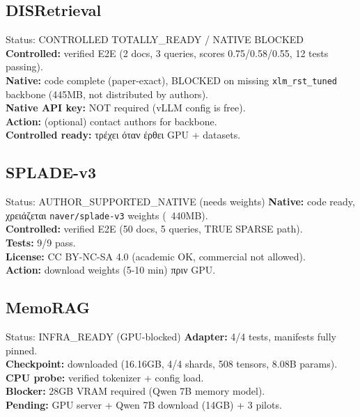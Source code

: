 \documentclass[11pt,a4paper]{article}
\begin{document}
\subsection{DISRetrieval}

\begin{statusbox}{Status: CONTROLLED TOTALLY\_READY / NATIVE BLOCKED}
\textbf{Controlled:} verified E2E (2 docs, 3 queries, scores 0.75/0.58/0.55, 12 tests passing). \\
\textbf{Native:} code complete (paper-exact), BLOCKED on missing \texttt{xlm\_rst\_tuned} backbone (445MB, not distributed by authors). \\
\textbf{Native API key:} NOT required (vLLM config is free). \\
\textbf{Action:} (optional) contact authors for backbone. \\
\textbf{Controlled ready:} τρέχει όταν έρθει GPU + datasets.
\end{statusbox}

\subsection{SPLADE-v3}

\begin{statusbox}{Status: AUTHOR\_SUPPORTED\_NATIVE (needs weights)}
\textbf{Native:} code ready, χρειάζεται \texttt{naver/splade-v3} weights (~440MB). \\
\textbf{Controlled:} verified E2E (50 docs, 5 queries, TRUE SPARSE path). \\
\textbf{Tests:} 9/9 pass. \\
\textbf{License:} CC BY-NC-SA 4.0 (academic OK, commercial not allowed). \\
\textbf{Action:} download weights (5-10 min) πριν GPU.
\end{statusbox}

\subsection{MemoRAG}

\begin{statusbox}{Status: INFRA\_READY (GPU-blocked)}
\textbf{Adapter:} 4/4 tests, manifests fully pinned. \\
\textbf{Checkpoint:} downloaded (16.16GB, 4/4 shards, 508 tensors, 8.08B params). \\
\textbf{CPU probe:} verified tokenizer + config load. \\
\textbf{Blocker:} 28GB VRAM required (Qwen 7B memory model). \\
\textbf{Pending:} GPU server + Qwen 7B download (14GB) + 3 pilots.
\end{statusbox}
\end{document}
